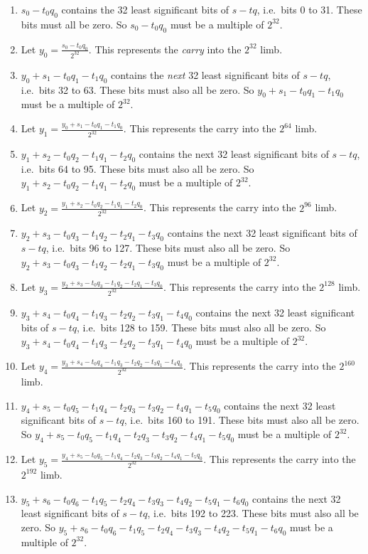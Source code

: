 \documentclass[a4paper, 12pt]{article}
\begin{document}
\begin{enumerate}
  \item $s_0-t_0q_0$ contains the 32 least significant bits of $s-tq$, i.e.~bits 0 to 31. These bits must all be zero. So $s_0-t_0q_0$ must be a multiple of $2^{32}$. 
  \item Let $y_0 = \frac{s_0-t_0q_0}{2^{32}}$. This represents the \textit{carry} into the $2^{32}$ limb.
  \item $y_0+s_1-t_0q_1-t_1q_0$ contains the \textit{next} 32 least significant bits of $s-tq$, i.e.~bits 32 to 63. These bits must also all be zero. So $y_0+s_1-t_0q_1-t_1q_0$ must be a multiple of $2^{32}$.
  \item Let $y_1 = \frac{y_0+s_1-t_0q_1-t_1q_0}{2^{32}}$. This represents the carry into the $2^{64}$ limb.
  \item $y_1+s_2-t_0q_2-t_1q_1-t_2q_0$ contains the next 32 least significant bits of $s-tq$, i.e.~bits 64 to 95. These bits must also all be zero. So $y_1+s_2-t_0q_2-t_1q_1-t_2q_0$ must be a multiple of $2^{32}$.
  \item Let $y_2 = \frac{y_1+s_2-t_0q_2-t_1q_1-t_2q_0}{2^{32}}$. This represents the carry into the $2^{96}$ limb.
  \item $y_2+s_3-t_0q_3-t_1q_2-t_2q_1-t_3q_0$ contains the next 32 least significant bits of $s-tq$, i.e.~bits 96 to 127. These bits must also all be zero. So $y_2+s_3-t_0q_3-t_1q_2-t_2q_1-t_3q_0$ must be a multiple of $2^{32}$.
  \item Let $y_3 = \frac{y_2+s_3-t_0q_3-t_1q_2-t_2q_1-t_3q_0}{2^{32}}$. This represents the carry into the $2^{128}$ limb.
  \item $y_3+s_4-t_0q_4-t_1q_3-t_2q_2-t_3q_1-t_4q_0$ contains the next 32 least significant bits of $s-tq$, i.e.~bits 128 to 159. These bits must also all be zero. So $y_3+s_4-t_0q_4-t_1q_3-t_2q_2-t_3q_1-t_4q_0$ must be a multiple of $2^{32}$.
  \item Let $y_4 = \frac{y_3+s_4-t_0q_4-t_1q_3-t_2q_2-t_3q_1-t_4q_0}{2^{32}}$. This represents the carry into the $2^{160}$ limb.
  \item $y_4+s_5-t_0q_5-t_1q_4-t_2q_3-t_3q_2-t_4q_1-t_5q_0$ contains the next 32 least significant bits of $s-tq$, i.e.~bits 160 to 191. These bits must also all be zero. So $y_4+s_5-t_0q_5-t_1q_4-t_2q_3-t_3q_2-t_4q_1-t_5q_0$ must be a multiple of $2^{32}$.
  \item Let $y_5 = \frac{y_4+s_5-t_0q_5-t_1q_4-t_2q_3-t_3q_2-t_4q_1-t_5q_0}{2^{32}}$. This represents the carry into the $2^{192}$ limb.
  \item $y_5+s_6-t_0q_6-t_1q_5-t_2q_4-t_3q_3-t_4q_2-t_5q_1-t_6q_0$ contains the next 32 least significant bits of $s-tq$, i.e.~bits 192 to 223. These bits must also all be zero. So $y_5+s_6-t_0q_6-t_1q_5-t_2q_4-t_3q_3-t_4q_2-t_5q_1-t_6q_0$ must be a multiple of $2^{32}$.

\end{enumerate}
\end{document}
